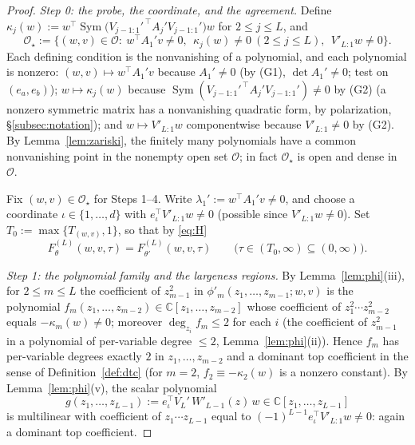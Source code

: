 \documentclass[11pt]{article}
\theoremstyle{definition}
\theoremstyle{remark}
\theoremstyle{plain}
\newcommand{\C}{\mathbb{C}}
\newcommand{\cO}{\mathcal{O}}
\newcommand{\Sym}{\operatorname{Sym}}
\begin{document}
\begin{proof}
\emph{Step 0: the probe, the coordinate, and the agreement.}
Define $\kappa_j(w):=w^\top\Sym\!\big(V_{j-1:1}'^{\,\top}A_j'V_{j-1:1}'\big)w$ for
$2\le j\le L$, and
\[
\cO_\star:=\big\{(w,v)\in\cO:\ w^\top A_1'v\neq0,\ \ \kappa_j(w)\neq0\ (2\le j\le L),
\ \ V'_{L:1}w\neq0\big\}.
\]
Each defining condition is the nonvanishing of a polynomial, and each polynomial is
nonzero: $(w,v)\mapsto w^\top A_1'v$ because $A_1'\neq0$ (by (G1), $\det A_1'\neq0$;
test on $(e_a,e_b)$); $w\mapsto\kappa_j(w)$ because
$\Sym(V_{j-1:1}'^{\,\top}A_j'V_{j-1:1}')\neq0$ by (G2) (a nonzero symmetric matrix has a
nonvanishing quadratic form, by polarization, \S\ref{subsec:notation}); and
$w\mapsto V'_{L:1}w$ componentwise because $V'_{L:1}\neq0$ by (G2).  By
Lemma~\ref{lem:zariski}, the finitely many polynomials have a common nonvanishing point
in the nonempty open set $\cO$; in fact $\cO_\star$ is open and dense in $\cO$.

Fix $(w,v)\in\cO_\star$ for Steps 1--4.  Write $\lambda_1':=w^\top A_1'v\neq0$, and
choose a coordinate $\iota\in\{1,\dots,d\}$ with $e_\iota^\top V'_{L:1}w\neq0$ (possible
since $V'_{L:1}w\neq0$).  Set $T_0:=\max\{T_{(w,v)},1\}$, so that by \eqref{eq:H}
\begin{equation}\label{eq:agree}
F^{(L)}_\theta(w,v,\tau)=F^{(L)}_{\theta'}(w,v,\tau)
\qquad\big(\tau\in(T_0,\infty)\subseteq(0,\infty)\big).
\end{equation}

\emph{Step 1: the polynomial family and the largeness regions.}
By Lemma~\ref{lem:phi}(iii), for $2\le m\le L$ the coefficient of $z_{m-1}^2$ in
$\phi'_m(z_1,\dots,z_{m-1};w,v)$ is the polynomial
$f_m(z_1,\dots,z_{m-2})\in\C[z_1,\dots,z_{m-2}]$ whose coefficient of
$z_1^2\cdots z_{m-2}^2$ equals $-\kappa_m(w)\neq0$; moreover
$\deg_{z_i}f_m\le2$ for each $i$ (the coefficient of $z_{m-1}^2$ in a polynomial of
per-variable degree $\le2$, Lemma~\ref{lem:phi}(ii)).  Hence $f_m$ has per-variable
degrees exactly $2$ in $z_1,\dots,z_{m-2}$ and a dominant top coefficient in the sense
of Definition~\ref{def:dtc} (for $m=2$, $f_2\equiv-\kappa_2(w)$ is a nonzero constant).
By Lemma~\ref{lem:phi}(v), the scalar polynomial
\[
g(z_1,\dots,z_{L-1}):=e_\iota^\top V_L'\,W'_{L-1}(z)\,w\in\C[z_1,\dots,z_{L-1}]
\]
is multilinear with coefficient of $z_1\cdots z_{L-1}$ equal to
$(-1)^{L-1}e_\iota^\top V'_{L:1}w\neq0$: again a dominant top coefficient.


\end{proof}
\end{document}
